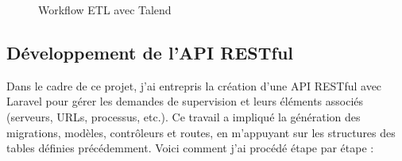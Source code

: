 \begin{figure}[h]
    \centering
    \caption{Workflow ETL avec Talend}
    \label{fig:etl_workflow}
\end{figure}

\subsection{Développement de l’API RESTful}

Dans le cadre de ce projet, j’ai entrepris la création d’une API RESTful avec Laravel pour gérer les demandes de supervision et leurs éléments associés (serveurs, URLs, processus, etc.). Ce travail a impliqué la génération des migrations, modèles, contrôleurs et routes, en m’appuyant sur les structures des tables définies précédemment. Voici comment j’ai procédé étape par étape :

